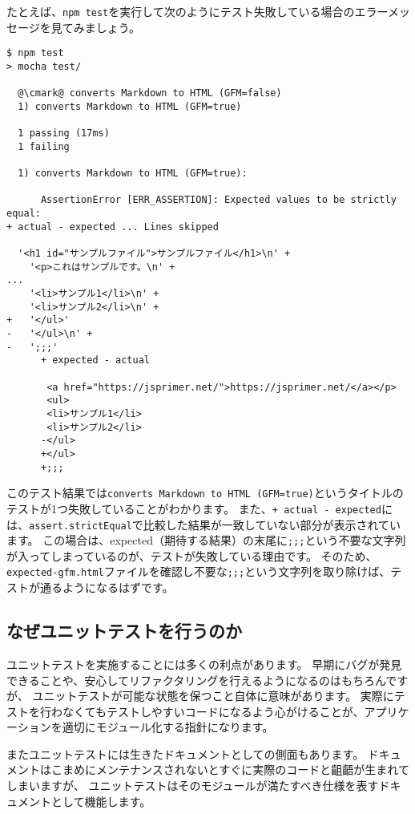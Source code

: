 たとえば、\texttt{npm test}を実行して次のようにテスト失敗している場合のエラーメッセージを見てみましょう。

\begin{lstlisting}[escapechar=@]
$ npm test
> mocha test/

  @\cmark@ converts Markdown to HTML (GFM=false)
  1) converts Markdown to HTML (GFM=true)

  1 passing (17ms)
  1 failing

  1) converts Markdown to HTML (GFM=true):

      AssertionError [ERR_ASSERTION]: Expected values to be strictly equal:
+ actual - expected ... Lines skipped

  '<h1 id="サンプルファイル">サンプルファイル</h1>\n' +
    '<p>これはサンプルです。\n' +
...
    '<li>サンプル1</li>\n' +
    '<li>サンプル2</li>\n' +
+   '</ul>'
-   '</ul>\n' +
-   ';;;'
      + expected - actual

       <a href="https://jsprimer.net/">https://jsprimer.net/</a></p>
       <ul>
       <li>サンプル1</li>
       <li>サンプル2</li>
      -</ul>
      +</ul>
      +;;;
\end{lstlisting}

このテスト結果では\texttt{converts Markdown to HTML (GFM=true)}というタイトルのテストが1つ失敗していることがわかります。
また、\texttt{+ actual - expected}には、\texttt{assert.strictEqual}で比較した結果が一致していない部分が表示されています。
この場合は、expected（期待する結果）の末尾に\texttt{;;;}という不要な文字列が入ってしまっているのが、テストが失敗している理由です。
そのため、\texttt{expected-gfm.html}ファイルを確認し不要な\texttt{;;;}という文字列を取り除けば、テストが通るようになるはずです。

\hypertarget{reason-for-unit-test}{%
\subsection{なぜユニットテストを行うのか}\label{reason-for-unit-test}}

ユニットテストを実施することには多くの利点があります。
早期にバグが発見できることや、安心してリファクタリングを行えるようになるのはもちろんですが、
ユニットテストが可能な状態を保つこと自体に意味があります。
実際にテストを行わなくてもテストしやすいコードになるよう心がけることが、アプリケーションを適切にモジュール化する指針になります。

またユニットテストには生きたドキュメントとしての側面もあります。
ドキュメントはこまめにメンテナンスされないとすぐに実際のコードと齟齬が生まれてしまいますが、
ユニットテストはそのモジュールが満たすべき仕様を表すドキュメントとして機能します。

